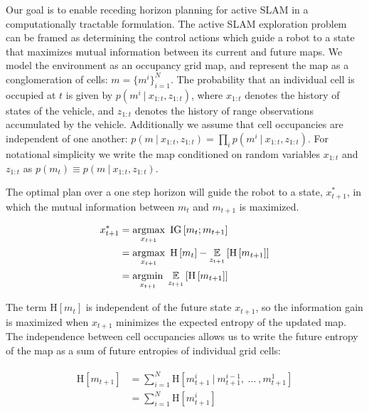 Our goal is to enable receding horizon planning for active SLAM in a computationally tractable formulation. The active SLAM exploration problem can be framed as determining the control actions which guide a robot to a state that maximizes mutual information between its current and future maps. We model the environment as an occupancy grid map, and represent the map as a conglomeration of cells: $m = \{m^{i}\}_{i=1}^{N}$. The probability that an individual cell is occupied at $t$ is given by $p\left(m^{i} \ \vert \ x_{1:t}, z_{1:t}\right)$, where $x_{1:t}$ denotes the history of states of the vehicle, and $z_{1:t}$ denotes the history of range observations accumulated by the vehicle. Additionally we assume that cell occupancies  are independent of one another: $p\left(m \ \vert \ x_{1:t}, z_{1:t}\right) = \prod_{i} p\left(m^{i} \ \vert \ x_{1:t}, z_{1:t}\right)$. For notational simplicity we write the map conditioned on random variables $x_{1:t}$ and $z_{1:t}$ as $p\left(m_{t}\right) \equiv p\left(m \ \vert \ x_{1:t}, z_{1:t}\right)$.

The optimal plan over a one step horizon will guide the robot to a state, $x_{t+1}^{*}$, in which the mutual information between $m_{t}$ and $m_{t+1}$ is maximized.

\begin{align} \begin{split}
    x_{t+1}^{*}
    &=
    \argmax_{x_{t+1}}
    \
    \text{IG}\left[
        m_{t}
        ;
        m_{t+1}
    \right]
    \\
    &=
    \argmax_{x_{t+1}}
    \
    \text{H}\left[
        m_{t}
    \right]
    -
    \expect_{z_{t+1}}\left[
        \text{H}\left[
            m_{t+1}
        \right]
    \right]
    \\
    &=
    \argmin_{x_{t+1}}
    \
    \expect_{z_{t+1}}\left[
        \text{H}\left[
            m_{t+1}
        \right]
    \right]
\end{split} \end{align}

The term $\text{H}\left[m_{t}\right]$ is independent of the future state $x_{t+1}$, so the information gain is maximized when $x_{t+1}$ minimizes the expected entropy of the updated map. The independence between cell occupancies allows us to write the future entropy of the map as a sum of future entropies of individual grid cells:

\begin{align} \begin{split}
    \text{H}\left[
        m_{t+1}
    \right]
    &=
    \sum_{i=1}^{N}
    \text{H}\left[
        m_{t+1}^{i}
        \ \vert \
        m_{t+1}^{i-1}
        , \
        \dots
        \ ,
        m_{t+1}^{1}
    \right]
    \\
    &=
    \sum_{i=1}^{N}
    \text{H}\left[
        m_{t+1}^{i}
    \right]
\end{split} \end{align}

